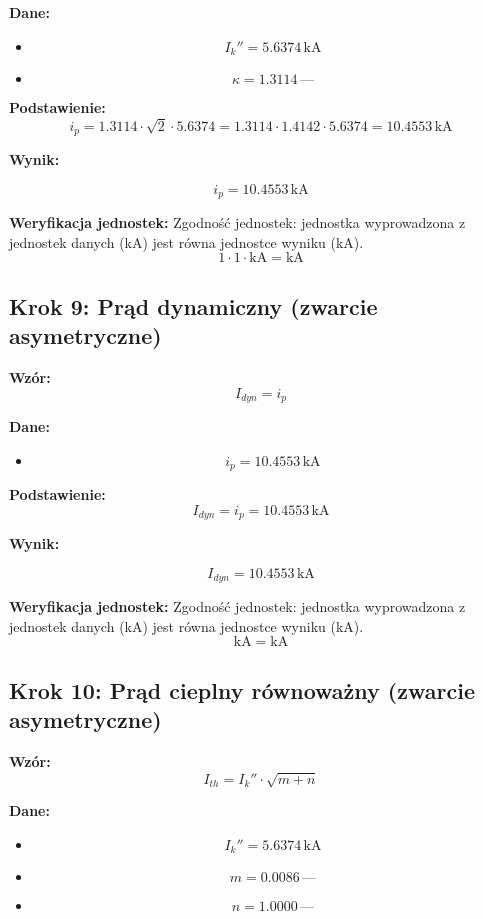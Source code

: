 \documentclass[11pt,a4paper]{article}
\begin{document}
\textbf{Dane:}
\begin{itemize}
  \item
$$
I_k'' = 5.6374\,\mathrm{kA}
$$
  \item
$$
\kappa = 1.3114\,\text{—}
$$
\end{itemize}

\textbf{Podstawienie:}
$$
i_p = 1.3114 \cdot \sqrt{2} \cdot 5.6374 = 1.3114 \cdot 1.4142 \cdot 5.6374 = 10.4553\,\text{kA}
$$

\textbf{Wynik:}
\begin{center}
$$
i_p = 10.4553\,\mathrm{kA}
$$
\end{center}

\textbf{Weryfikacja jednostek:} Zgodność jednostek: jednostka wyprowadzona z jednostek danych (kA) jest równa jednostce wyniku (kA).
$$
1 \cdot 1 \cdot \mathrm{kA} = \mathrm{kA}
$$

\subsection{Krok 9: Prąd dynamiczny (zwarcie asymetryczne)}

\textbf{Wzór:}
$$
I_{dyn} = i_p
$$

\textbf{Dane:}
\begin{itemize}
  \item
$$
i_p = 10.4553\,\mathrm{kA}
$$
\end{itemize}

\textbf{Podstawienie:}
$$
I_{dyn} = i_p = 10.4553\,\text{kA}
$$

\textbf{Wynik:}
\begin{center}
$$
I_{dyn} = 10.4553\,\mathrm{kA}
$$
\end{center}

\textbf{Weryfikacja jednostek:} Zgodność jednostek: jednostka wyprowadzona z jednostek danych (kA) jest równa jednostce wyniku (kA).
$$
\mathrm{kA} = \mathrm{kA}
$$

\subsection{Krok 10: Prąd cieplny równoważny (zwarcie asymetryczne)}

\textbf{Wzór:}
$$
I_{th} = I_k'' \cdot \sqrt{m + n}
$$

\textbf{Dane:}
\begin{itemize}
  \item
$$
I_k'' = 5.6374\,\mathrm{kA}
$$
  \item
$$
m = 0.0086\,\text{—}
$$
  \item
$$
n = 1.0000\,\text{—}
$$
\end{itemize}
\end{document}
